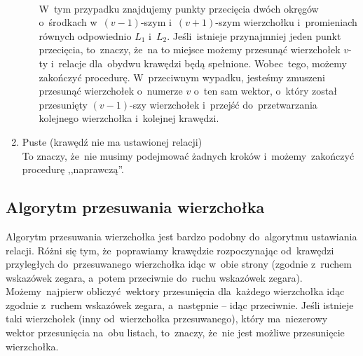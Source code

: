 \documentclass[11pt, a4paper]{article}
\begin{document}
\begin{enumerate}
\begin{enumerate}
 \\
      W~tym przypadku znajdujemy punkty przecięcia dwóch okręgów o~środkach w~$(v-1)$-szym i~$(v+1)$-szym wierzchołku
      i~promieniach równych odpowiednio $L_1$ i~$L_2$. Jeśli~istnieje przynajmniej jeden punkt przecięcia,
      to~znaczy, że~na to miejsce możemy przesunąć wierzchołek $v$-ty i~relacje dla~obydwu krawędzi będą spełnione.
      Wobec~tego, możemy zakończyć procedurę. W~przeciwnym wypadku, jesteśmy zmuszeni przesunąć wierzchołek o~numerze $v$
      o~ten sam wektor, o~który został przesunięty $(v-1)$-szy wierzchołek i~przejść do~przetwarzania kolejnego wierzchołka i~kolejnej
      krawędzi. 	

      
     \end{enumerate}


  \item Puste (krawędź nie ma ustawionej relacji) \\
    To znaczy, że~nie musimy podejmować żadnych kroków i~możemy~zakończyć procedurę ,,naprawczą''.
  
  
 \end{enumerate}
\subsection{Algorytm przesuwania wierzchołka}
Algorytm przesuwania wierzchołka jest bardzo podobny do~algorytmu ustawiania relacji. Różni się tym, że~poprawiamy krawędzie
rozpoczynając od~krawędzi przyległych do~przesuwanego wierzchołka idąc w~obie strony (zgodnie z~ruchem wskazówek zegara,
a~potem przeciwnie do~ruchu wskazówek zegara). Możemy~najpierw obliczyć wektory przesunięcia dla~każdego wierzchołka idąc
zgodnie z~ruchem wskazówek zegara, a~następnie -- idąc przeciwnie. Jeśli istnieje taki wierzchołek (inny od~wierzchołka przesuwanego),
który ma~niezerowy wektor przesunięcia na~obu listach, to~znaczy, że~nie jest możliwe przesunięcie wierzchołka.
 
 

 
\end{document}
